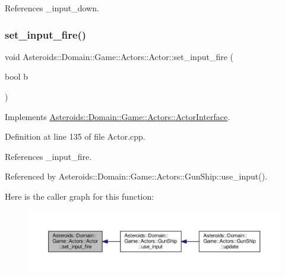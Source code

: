References \+\_\+input\+\_\+down.

\mbox{\label{classAsteroids_1_1Domain_1_1Game_1_1Actors_1_1Actor_ade49ee1d618ef27e07314794fcf25cf0}} 
\subsubsection{\texorpdfstring{set\+\_\+input\+\_\+fire()}{set\_input\_fire()}}
{\footnotesize\ttfamily void Asteroids\+::\+Domain\+::\+Game\+::\+Actors\+::\+Actor\+::set\+\_\+input\+\_\+fire (\begin{DoxyParamCaption}\item[{bool}]{b }\end{DoxyParamCaption})\hspace{0.3cm}{\ttfamily [virtual]}}



Implements \hyperlink{classAsteroids_1_1Domain_1_1Game_1_1Actors_1_1ActorInterface_aa1d77d8c42a23f720925c763d1b1780e}{Asteroids\+::\+Domain\+::\+Game\+::\+Actors\+::\+Actor\+Interface}.



Definition at line 135 of file Actor.\+cpp.



References \+\_\+input\+\_\+fire.



Referenced by Asteroids\+::\+Domain\+::\+Game\+::\+Actors\+::\+Gun\+Ship\+::use\+\_\+input().

Here is the caller graph for this function\+:\nopagebreak
\begin{figure}[H]
\begin{center}
\leavevmode
\includegraphics[width=350pt]{classAsteroids_1_1Domain_1_1Game_1_1Actors_1_1Actor_ade49ee1d618ef27e07314794fcf25cf0_icgraph}
\end{center}
\end{figure}
\mbox{\label{classAsteroids_1_1Domain_1_1Game_1_1Actors_1_1Actor_aada120155b2f6b72c6af18296fd97bc7}} 
